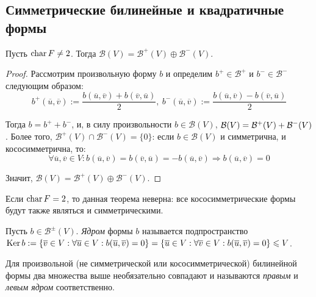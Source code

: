 \subsection{Симметрические билинейные и квадратичные формы}

\begin{theorem}
	Пусть $\operatorname{char}{F} \ne 2$. Тогда $\mathcal{B}(V) = \mathcal{B}^+(V) \oplus \mathcal{B}^-(V)$.
\end{theorem}

\begin{proof}
	Рассмотрим произвольную форму $b$ и определим $b^+ \in \mathcal{B}^+$ и $b^- \in \mathcal{B}^-$ следующим образом:
	\[b^+(\overline{u}, \overline{v}) := \frac{b(\overline{u}, \overline{v}) + b(\overline{v}, \overline{u})}{2},~b^-(\overline{u}, \overline{v}) := \frac{b(\overline{u}, \overline{v}) - b(\overline{v}, \overline{u})}{2}\]
	
	Тогда $b = b^+ + b^-$, и, в силу произвольности $b \in \mathcal{B}(V)$, $\mathcal{B}(V) \hm{=} \mathcal{B}^+(V) + \mathcal{B}^-(V)$. Более того, $\mathcal{B}^+(V) \cap \mathcal{B}^-(V) = \{0\}$: если $b \in \mathcal{B}(V)$ и симметрична, и кососимметрична, то:
	\[\forall \overline{u}, \overline{v} \in V: b(\overline{u}, \overline{v}) = b(\overline{v}, \overline{u}) = -b(\overline{u}, \overline{v}) \Rightarrow b(\overline{u}, \overline{v}) = 0\]
	
	Значит, $\mathcal{B}(V) = \mathcal{B}^+(V) \oplus \mathcal{B}^-(V)$.
\end{proof}

\begin{note}
	Если $\operatorname{char}{F} = 2$, то данная теорема неверна: все кососимметрические формы будут также являться и симметрическими.
\end{note}

\begin{definition}
	Пусть $b \in \mathcal{B}^\pm(V)$. \textit{Ядром} формы $b$ называется подпространство $\operatorname{Ker}{b} := \{\overline{v} \in V: \forall \overline{u} \in V: b(\overline{u}, \overline{v}) = 0\} = \{\overline{u} \in V: \forall \overline{v} \in V: b(\overline{u}, \overline{v}) = 0\} \leqslant V$.
\end{definition}

\begin{note}
	Для произвольной (не симметрической или кососимметрической) билинейной формы два множества выше необязательно совпадают и называются \textit{правым} и \textit{левым ядром} соответственно.
\end{note}

